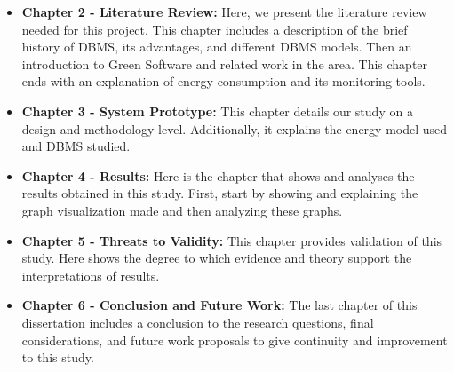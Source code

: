 \begin{itemize}
    \item \textbf{Chapter 2 - Literature Review:}  Here, we present the literature review needed for this project. This chapter includes a description of the brief history of DBMS, its advantages, and different DBMS models. Then an introduction to Green Software and related work in the area. This chapter ends with an explanation of energy consumption and its monitoring tools.
    
    \item \textbf{Chapter 3 - System Prototype:}  This chapter details our study on a design and methodology level. Additionally, it explains the energy model used and DBMS studied. 
    
    \item \textbf{Chapter 4 - Results:}  Here is the chapter that shows and analyses the results obtained in this study. First, start by showing and explaining the graph visualization made and then analyzing these graphs.
    
    \item \textbf{Chapter 5 - Threats to Validity:}  This chapter provides validation of this study. Here shows the degree to which evidence and theory support the interpretations of results.

    \item \textbf{Chapter 6 - Conclusion and Future Work:} The last chapter of this dissertation includes a conclusion to the research questions, final considerations, and future work proposals to give continuity and improvement to this study.
    
\end{itemize}